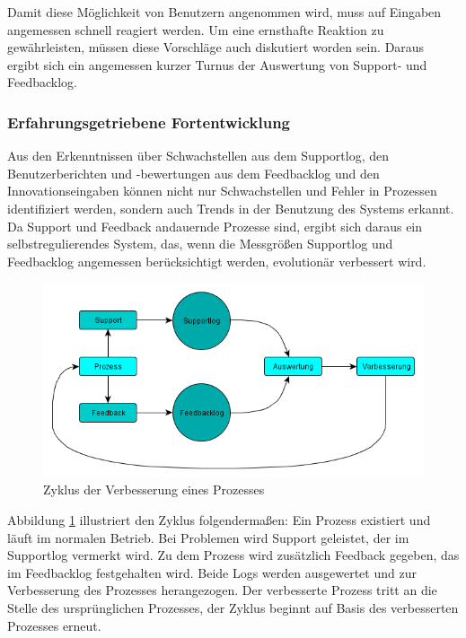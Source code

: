 Damit diese Möglichkeit von Benutzern angenommen wird, muss auf Eingaben angemessen 
schnell reagiert werden. Um eine ernsthafte Reaktion zu gewährleisten, müssen diese 
Vorschläge auch diskutiert worden sein. Daraus ergibt sich ein angemessen kurzer Turnus 
der Auswertung von Support- und Feedbacklog.

\subsubsection{Erfahrungsgetriebene Fortentwicklung}
Aus den Erkenntnissen über Schwachstellen aus dem Supportlog, den Benutzerberichten und 
-bewertungen aus dem Feedbacklog und den Innovationseingaben können nicht nur 
Schwachstellen und Fehler in Prozessen identifiziert werden, sondern auch Trends in der 
Benutzung des Systems erkannt. Da Support und Feedback andauernde Prozesse sind, ergibt 
sich daraus ein selbstregulierendes System, das, wenn die Messgrößen Supportlog und 
Feedbacklog angemessen berücksichtigt werden, evolutionär verbessert wird.

\begin{figure}[h!]
	\centering
	\includegraphics[width=\textwidth]{kapitel/gruppe3/bilder/zyklus_prozessverbesserung}
	\caption{Zyklus der Verbesserung eines Prozesses}
	\label{fig_zyklus_prozessverbesserung}
\end{figure}

Abbildung \ref{fig_zyklus_prozessverbesserung} illustriert den Zyklus folgendermaßen: Ein Prozess existiert und läuft im 
normalen Betrieb. Bei Problemen wird Support geleistet, der im Supportlog vermerkt wird. Zu 
dem Prozess wird zusätzlich Feedback gegeben, das im Feedbacklog festgehalten wird. Beide 
Logs werden ausgewertet und zur Verbesserung des Prozesses herangezogen. Der 
verbesserte Prozess tritt an die Stelle des ursprünglichen Prozesses, der Zyklus beginnt auf 
Basis des verbesserten Prozesses erneut.




















